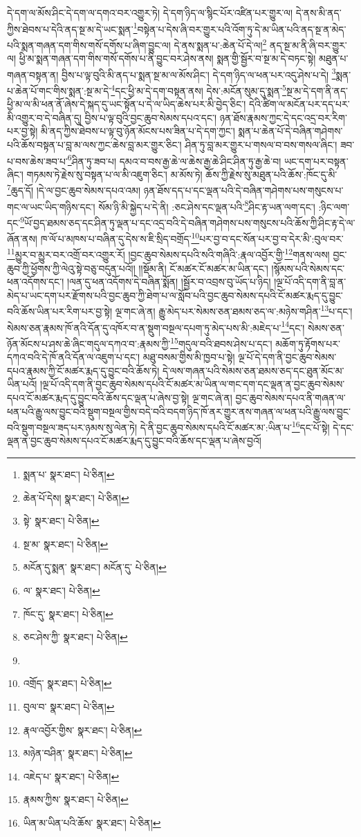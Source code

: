 དེ་དག་ལ་མོས་ཤིང་དེ་དག་ལ་དགའ་བར་འགྱུར་ཏེ། དེ་དག་ཉིད་ལ་སྙིང་པོར་འཛིན་པར་གྱུར་ལ། དེ་ནས་མི་ནད་ཀྱིས་ཐེབས་པ་དེའི་ནད་སྔ་མ་དེ་ཡང་སྨན་\footnote{སྨན་པ་  སྣར་ཐང་།  པེ་ཅིན། }བསྟེན་པ་དེས་ཞི་བར་གྱུར་པའི་འོག་ཏུ་དེ་མ་ཡིན་པའི་ནད་སྔ་ན་མེད་པའི་སྨན་གཞན་དག་གིས་གསོ་དགོས་པ་ཞིག་བྱུང་ལ། དེ་ནས་སྨན་པ་:ཆེན་པོ་དེ་ལ།\footnote{ཆེན་པོ་དེས།  སྣར་ཐང་།  པེ་ཅིན། } ནད་སྔ་མ་ནི་ཞི་བར་གྱུར་ལ། ཕྱི་མ་སྨན་གཞན་དག་གིས་གསོ་དགོས་པ་ནི་བྱུང་བར་ཤེས་ནས། སྨན་གྱི་སྦྱོར་བ་སྔ་མ་དེ་བཏང་སྟེ། མཐུན་པ་གཞན་བསྟན་ན། བྱིས་པ་ལྟ་བུའི་མི་ནད་པ་སྨན་སྔ་མ་ལ་མོས་ཤིང་། དེ་དག་ཉིད་ལ་ཕན་པར་འདུ་ཤེས་པ་དེ། \footnote{སྟེ་  སྣར་ཐང་།  པེ་ཅིན། }སྨན་པ་ཆེན་པོ་གང་གིས་སྨན་:སྔ་མ་དེ་\footnote{སྔ་མ་  སྣར་ཐང་།  པེ་ཅིན། }དང་ཕྱི་མ་དེ་དག་བསྟན་ནས། དེས་:མངོན་སུམ་དུ་སྨན་\footnote{མངོན་དུ་སྨན་  སྣར་ཐང་། མངོན་དུ་  པེ་ཅིན། }སྔ་མ་དེ་དག་ནི་ནད་ཕྱི་མ་ལ་མི་ཕན་ནོ་ཞེས་དེ་སྐད་དུ་ཡང་སྟོན་པ་དེ་ལ་ཡིད་ཆེས་པར་མི་བྱེད་ཅིང་། དེའི་ཚིག་ལ་མངོན་པར་དད་པར་མི་འགྱུར་བ་དེ་བཞིན་དུ། བྱིས་པ་ལྟ་བུའི་བྱང་ཆུབ་སེམས་དཔའ་དང་། ཉན་ཐོས་རྣམས་ཀྱང་དེ་དང་འདྲ་བར་རིག་པར་བྱ་སྟེ། མི་ནད་ཀྱིས་ཐེབས་པ་ལྟ་བུ་ཉོན་མོངས་པས་ཟིན་པ་དེ་དག་ཀྱང་། སྨན་པ་ཆེན་པོ་དེ་བཞིན་གཤེགས་པའི་ཆོས་བསྟན་པ་བླ་མ་ལས་ཀྱང་ཆེས་བླ་མར་གྱུར་ཅིང་། ཤིན་ཏུ་བླ་མར་གྱུར་པ་གསལ་བ་བས་གསལ་ཞིང་། ཟབ་པ་བས་ཆེས་ཟབ་པ་\footnote{ལ་  སྣར་ཐང་།  པེ་ཅིན། }ཤིན་ཏུ་ཟབ་པ། དམའ་བ་བས་རྒྱ་ཆེ་ལ་ཆེས་རྒྱ་ཆེ་ཤིང་ཤིན་ཏུ་རྒྱ་ཆེ་བ། ཡང་དག་པར་བསྟན་ཞིང་། གཏམས་ཏེ་རྗེས་སུ་བསྟན་པ་ལ་མི་འཇུག་ཅིང་། མ་མོས་ཏེ། ཆོས་ཀྱི་རྗེས་སུ་མཐུན་པའི་ཆོས་:ཁོང་དུ་མི་\footnote{ཁོང་དུ་  སྣར་ཐང་།  པེ་ཅིན། }ཆུད་དོ། །དེ་ལ་བྱང་ཆུབ་སེམས་དཔའ་འམ། ཉན་ཐོས་དད་པ་དང་ལྡན་པའི་དེ་བཞིན་གཤེགས་པས་གསུངས་པ་གང་ལ་ཡང་ཡིད་གཉིས་དང་། སོམ་ཉི་མི་སྐྱེད་པ་དེ་ནི། :ཅང་ཤེས་དང་ལྡན་པའི་\footnote{ཅང་ཤེས་ཀྱི་  སྣར་ཐང་།  པེ་ཅིན། }ཤིང་རྟ་ཡན་ལག་དང་། :ཉིང་ལག་དང་\footnote{}ཡོ་བྱད་ཐམས་ཅད་དང་ཤིན་ཏུ་ལྡན་པ་དང་འདྲ་བའི་དེ་བཞིན་གཤེགས་པས་གསུངས་པའི་ཆོས་ཀྱི་ཤིང་རྟ་དེ་ལ་ཞོན་ནས། ཁ་ལོ་པ་མཁས་པ་བཞིན་དུ་དེས་ས་ཇི་སྲིད་བགྲོད་\footnote{འགྲོད་  སྣར་ཐང་།  པེ་ཅིན། }པར་བྱ་བ་དང་སོན་པར་བྱ་བ་དེར་མི་:བུལ་བར་\footnote{བུལ་བ་  སྣར་ཐང་།  པེ་ཅིན། }མྱུར་བ་མྱུར་བར་འགྲོ་བར་འགྱུར་རོ། །བྱང་ཆུབ་སེམས་དཔའི་སའི་གཞིའི་:རྣལ་འབྱོར་གྱི་\footnote{རྣལ་འབྱོར་གྱིས་  སྣར་ཐང་།  པེ་ཅིན། }གནས་ལས། བྱང་ཆུབ་ཀྱི་ཕྱོགས་ཀྱི་ལེའུ་སྟེ་བཅུ་བདུན་པའོ།། །།སྡོམ་ནི། ངོ་མཚར་ངོ་མཚར་མ་ཡིན་དང་། །སྙོམས་པའི་སེམས་དང་ཕན་འདོགས་དང་། །ལན་དུ་ཕན་འདོགས་དེ་བཞིན་སྨོན། །སྦྱོར་བ་འབྲས་བུ་ཡོད་པ་ཉིད། །ལྔ་པོ་འདི་དག་ནི་བླ་ན་མེད་པ་ཡང་དག་པར་རྫོགས་པའི་བྱང་ཆུབ་ཀྱི་ཐེག་པ་ལ་སློབ་པའི་བྱང་ཆུབ་སེམས་དཔའི་ངོ་མཚར་རྨད་དུ་བྱུང་བའི་ཆོས་ཡིན་པར་རིག་པར་བྱ་སྟེ། ལྔ་གང་ཞེ་ན། རྒྱུ་མེད་པར་སེམས་ཅན་ཐམས་ཅད་ལ་:མཉེས་གཤིན་\footnote{མཉེན་བཤིན་  སྣར་ཐང་།  པེ་ཅིན། }པ་དང་། སེམས་ཅན་རྣམས་ཁོ་ནའི་དོན་དུ་འཁོར་བ་ན་སྡུག་བསྔལ་དཔག་ཏུ་མེད་པས་མི་:མཇེད་པ་\footnote{འཇེད་པ་  སྣར་ཐང་།  པེ་ཅིན། }དང་། སེམས་ཅན་ཉོན་མོངས་པ་ཤས་ཆེ་ཞིང་གདུལ་དཀའ་བ་:རྣམས་ཀྱི་\footnote{རྣམས་ཀྱིས་  སྣར་ཐང་།  པེ་ཅིན། }གདུལ་བའི་ཐབས་ཤེས་པ་དང་། མཆོག་ཏུ་རྟོགས་པར་དཀའ་བའི་དེ་ཁོ་ནའི་དོན་ལ་འཇུག་པ་དང་། མཐུ་བསམ་གྱིས་མི་ཁྱབ་པ་སྟེ། ལྔ་པོ་དེ་དག་ནི་བྱང་ཆུབ་སེམས་དཔའ་རྣམས་ཀྱི་ངོ་མཚར་རྨད་དུ་བྱུང་བའི་ཆོས་ཏེ། དེ་ལས་གཞན་པའི་སེམས་ཅན་ཐམས་ཅད་དང་ཐུན་མོང་མ་ཡིན་པའོ། །ལྔ་པོ་འདི་དག་ནི་བྱང་ཆུབ་སེམས་དཔའི་ངོ་མཚར་མ་ཡིན་ལ་གང་དག་དང་ལྡན་ན་བྱང་ཆུབ་སེམས་དཔའ་ངོ་མཚར་རྨད་དུ་བྱུང་བའི་ཆོས་དང་ལྡན་པ་ཞེས་བྱ་སྟེ། ལྔ་གང་ཞེ་ན། བྱང་ཆུབ་སེམས་དཔའ་ནི་གཞན་ལ་ཕན་པའི་རྒྱུ་ལས་བྱུང་བའི་སྡུག་བསྔལ་གྱིས་བདེ་བའི་བདག་ཉིད་ཁོ་ནར་གྱུར་ནས་གཞན་ལ་ཕན་པའི་རྒྱུ་ལས་བྱུང་བའི་སྡུག་བསྔལ་ཟད་པར་ཉམས་སུ་ལེན་ཏེ། དེ་ནི་བྱང་ཆུབ་སེམས་དཔའི་ངོ་མཚར་མ་:ཡིན་པ་\footnote{ཡིན་མ་ཡིན་པའི་ཆོས་  སྣར་ཐང་།  པེ་ཅིན། }དང་པོ་སྟེ། དེ་དང་ལྡན་ན་བྱང་ཆུབ་སེམས་དཔའ་ངོ་མཚར་རྨད་དུ་བྱུང་བའི་ཆོས་དང་ལྡན་པ་ཞེས་བྱའོ། 